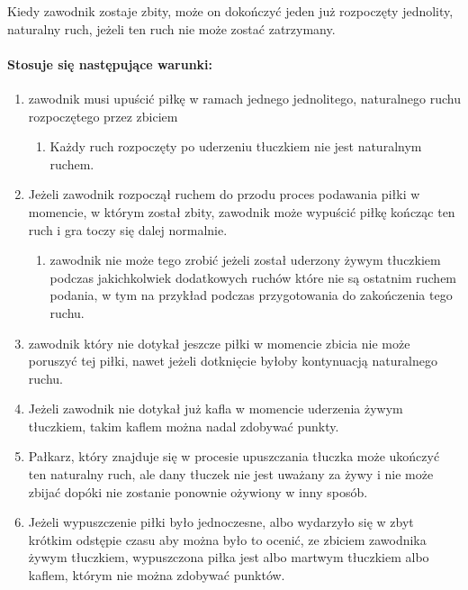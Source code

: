 \documentclass[12pt]{article}
\begin{document}
Kiedy zawodnik zostaje zbity, może on dokończyć jeden już rozpoczęty
jednolity, naturalny ruch, jeżeli ten ruch nie może zostać zatrzymany.

\paragraph{Stosuje się następujące warunki:}

\begin{enumerate}
	\item
	      zawodnik musi upuścić piłkę w ramach jednego jednolitego, naturalnego
	      ruchu rozpoczętego przez zbiciem

	      \begin{enumerate}
		      \item
		            Każdy ruch rozpoczęty po uderzeniu tłuczkiem nie jest naturalnym
		            ruchem.
	      \end{enumerate}
	\item
	      Jeżeli zawodnik rozpoczął ruchem do przodu proces podawania piłki w
	      momencie, w którym został zbity, zawodnik może wypuścić piłkę kończąc
	      ten ruch i gra toczy się dalej normalnie.

	      \begin{enumerate}
		      \item
		            zawodnik nie może tego zrobić jeżeli został uderzony żywym tłuczkiem
		            podczas jakichkolwiek dodatkowych ruchów które nie są ostatnim
		            ruchem podania, w tym na przykład podczas przygotowania do
		            zakończenia tego ruchu.
	      \end{enumerate}
	\item
	      zawodnik który nie dotykał jeszcze piłki w momencie zbicia nie może
	      poruszyć tej piłki, nawet jeżeli dotknięcie byłoby kontynuacją
	      naturalnego ruchu.
	\item
	      Jeżeli zawodnik nie dotykał już kafla w momencie uderzenia żywym
	      tłuczkiem, takim kaflem można nadal zdobywać punkty.
	\item
	      Pałkarz, który znajduje się w procesie upuszczania tłuczka może
	      ukończyć ten naturalny ruch, ale dany tłuczek nie jest uważany za żywy
	      i nie może zbijać dopóki nie zostanie ponownie ożywiony w inny sposób.
	\item
	      Jeżeli wypuszczenie piłki było jednoczesne, albo wydarzyło się w zbyt
	      krótkim odstępie czasu aby można było to ocenić, ze zbiciem zawodnika
	      żywym tłuczkiem, wypuszczona piłka jest albo martwym tłuczkiem albo
	      kaflem, którym nie można zdobywać punktów.
\end{enumerate}
\end{document}

